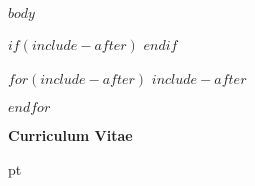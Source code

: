 \documentclass[11 pt]{report}
\begin{document}

\startofchapters

$body$

%

\pagebreak
$if(include-after)$
\appendix
\appendixeqnumbering
$endif$

$for(include-after)$
$include-after$

$endfor$


%


%
\pagebreak
\vspace*{.26 in}
\begin{center}
    {\Large \bf Curriculum Vitae}
\end{center}
 pt
\noindent

\noindent
\end{document}
